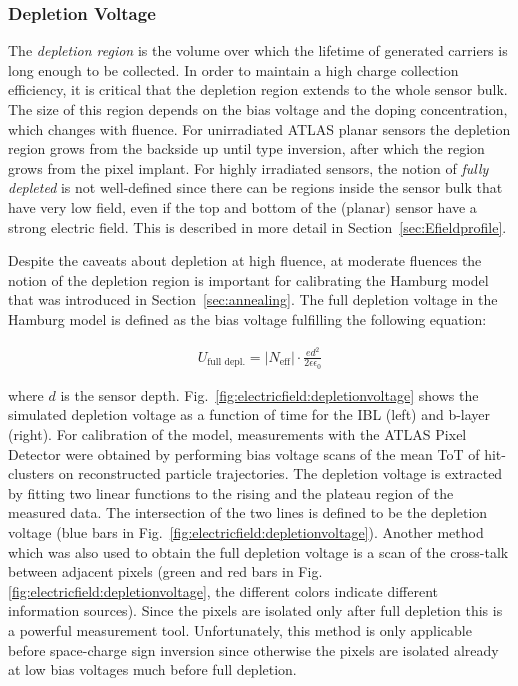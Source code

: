 \subsubsection{Depletion Voltage}
\label{sec:depletionvoltage}

The \textit{depletion region} is the volume over which the lifetime of generated carriers is long enough to be collected.  In order to maintain a high charge collection efficiency, it is critical that the depletion region extends to the whole sensor bulk.  The size of this region depends on the bias voltage and the doping concentration, which changes with fluence.   For unirradiated ATLAS planar sensors the depletion region grows from the backside up until type inversion, after which the region grows from the pixel implant.  For highly irradiated sensors, the notion of \textit{fully depleted} is not well-defined since there can be regions inside the sensor bulk that have very low field, even if the top and bottom of the (planar) sensor have a strong electric field.  This is described in more detail in Section~\ref{sec:Efieldprofile}.

 Despite the caveats about depletion at high fluence, at moderate fluences the notion of the depletion region is important for calibrating the Hamburg model that was introduced in Section~\ref{sec:annealing}.  The full depletion voltage in the Hamburg model is defined as the bias voltage fulfilling the following equation:

\begin{align}
\label{eq:hamburg13}
U_\text{full depl.} = |N_\text{eff}| \cdot \frac{ed^2}{2\epsilon\epsilon_0}
\end{align}

where $d$ is the sensor depth. Fig.~\ref{fig:electricfield:depletionvoltage} shows the simulated depletion voltage as a function of time for the IBL
 (left) and b-layer (right). For calibration of the model, measurements with the ATLAS Pixel Detector were obtained by performing bias voltage scans of the mean ToT of hit-clusters on reconstructed particle trajectories. The depletion voltage is extracted by fitting two linear functions to the rising and the plateau region of the measured data. The intersection of the two lines is defined to be the depletion voltage (blue bars in Fig.~\ref{fig:electricfield:depletionvoltage}). Another method which was also used to obtain the full depletion voltage is a scan of the cross-talk between adjacent pixels (green and red bars in Fig.\ref{fig:electricfield:depletionvoltage}, the different colors indicate different information sources). Since the pixels are isolated only after full depletion this is a powerful measurement tool. Unfortunately, this method is only applicable before space-charge sign inversion since otherwise the pixels are isolated already at low bias voltages much before full depletion.

